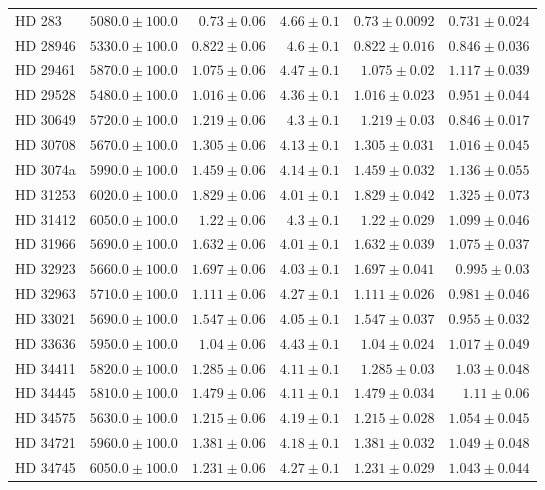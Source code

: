 \begin{longtable*}{lrrrrr}
HD 283 & $5080.0\pm 100.0$ & $0.73\pm 0.06$ & $4.66\pm 0.1$ & $0.73\pm 0.0092$ & $0.731\pm 0.024$ \\ 
HD 28946 & $5330.0\pm 100.0$ & $0.822\pm 0.06$ & $4.6\pm 0.1$ & $0.822\pm 0.016$ & $0.846\pm 0.036$ \\ 
HD 29461 & $5870.0\pm 100.0$ & $1.075\pm 0.06$ & $4.47\pm 0.1$ & $1.075\pm 0.02$ & $1.117\pm 0.039$ \\ 
HD 29528 & $5480.0\pm 100.0$ & $1.016\pm 0.06$ & $4.36\pm 0.1$ & $1.016\pm 0.023$ & $0.951\pm 0.044$ \\ 
HD 30649 & $5720.0\pm 100.0$ & $1.219\pm 0.06$ & $4.3\pm 0.1$ & $1.219\pm 0.03$ & $0.846\pm 0.017$ \\ 
HD 30708 & $5670.0\pm 100.0$ & $1.305\pm 0.06$ & $4.13\pm 0.1$ & $1.305\pm 0.031$ & $1.016\pm 0.045$ \\ 
HD 3074a & $5990.0\pm 100.0$ & $1.459\pm 0.06$ & $4.14\pm 0.1$ & $1.459\pm 0.032$ & $1.136\pm 0.055$ \\ 
HD 31253 & $6020.0\pm 100.0$ & $1.829\pm 0.06$ & $4.01\pm 0.1$ & $1.829\pm 0.042$ & $1.325\pm 0.073$ \\ 
HD 31412 & $6050.0\pm 100.0$ & $1.22\pm 0.06$ & $4.3\pm 0.1$ & $1.22\pm 0.029$ & $1.099\pm 0.046$ \\ 
HD 31966 & $5690.0\pm 100.0$ & $1.632\pm 0.06$ & $4.01\pm 0.1$ & $1.632\pm 0.039$ & $1.075\pm 0.037$ \\ 
HD 32923 & $5660.0\pm 100.0$ & $1.697\pm 0.06$ & $4.03\pm 0.1$ & $1.697\pm 0.041$ & $0.995\pm 0.03$ \\ 
HD 32963 & $5710.0\pm 100.0$ & $1.111\pm 0.06$ & $4.27\pm 0.1$ & $1.111\pm 0.026$ & $0.981\pm 0.046$ \\ 
HD 33021 & $5690.0\pm 100.0$ & $1.547\pm 0.06$ & $4.05\pm 0.1$ & $1.547\pm 0.037$ & $0.955\pm 0.032$ \\ 
HD 33636 & $5950.0\pm 100.0$ & $1.04\pm 0.06$ & $4.43\pm 0.1$ & $1.04\pm 0.024$ & $1.017\pm 0.049$ \\ 
HD 34411 & $5820.0\pm 100.0$ & $1.285\pm 0.06$ & $4.11\pm 0.1$ & $1.285\pm 0.03$ & $1.03\pm 0.048$ \\ 
HD 34445 & $5810.0\pm 100.0$ & $1.479\pm 0.06$ & $4.11\pm 0.1$ & $1.479\pm 0.034$ & $1.11\pm 0.06$ \\ 
HD 34575 & $5630.0\pm 100.0$ & $1.215\pm 0.06$ & $4.19\pm 0.1$ & $1.215\pm 0.028$ & $1.054\pm 0.045$ \\ 
HD 34721 & $5960.0\pm 100.0$ & $1.381\pm 0.06$ & $4.18\pm 0.1$ & $1.381\pm 0.032$ & $1.049\pm 0.048$ \\ 
HD 34745 & $6050.0\pm 100.0$ & $1.231\pm 0.06$ & $4.27\pm 0.1$ & $1.231\pm 0.029$ & $1.043\pm 0.044$ \\ 

\end{longtable*}
